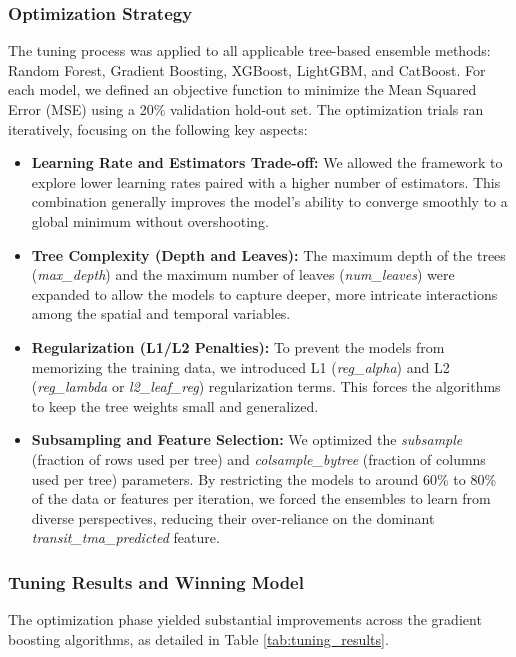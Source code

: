 \subsubsection{Optimization Strategy}
The tuning process was applied to all applicable tree-based ensemble methods: Random Forest, Gradient Boosting, XGBoost, LightGBM, and CatBoost. For each model, we defined an objective function to minimize the Mean Squared Error (MSE) using a 20\% validation hold-out set. The optimization trials ran iteratively, focusing on the following key aspects:

\begin{itemize}
    \item \textbf{Learning Rate and Estimators Trade-off:} We allowed the framework to explore lower learning rates paired with a higher number of estimators. This combination generally improves the model's ability to converge smoothly to a global minimum without overshooting.
    \item \textbf{Tree Complexity (Depth and Leaves):} The maximum depth of the trees (\textit{max\_depth}) and the maximum number of leaves (\textit{num\_leaves}) were expanded to allow the models to capture deeper, more intricate interactions among the spatial and temporal variables.
    \item \textbf{Regularization (L1/L2 Penalties):} To prevent the models from memorizing the training data, we introduced L1 (\textit{reg\_alpha}) and L2 (\textit{reg\_lambda} or \textit{l2\_leaf\_reg}) regularization terms. This forces the algorithms to keep the tree weights small and generalized.
    \item \textbf{Subsampling and Feature Selection:} We optimized the \textit{subsample} (fraction of rows used per tree) and \textit{colsample\_bytree} (fraction of columns used per tree) parameters. By restricting the models to around 60\% to 80\% of the data or features per iteration, we forced the ensembles to learn from diverse perspectives, reducing their over-reliance on the dominant \textit{transit\_tma\_predicted} feature.
\end{itemize}

\subsubsection{Tuning Results and Winning Model}
The optimization phase yielded substantial improvements across the gradient boosting algorithms, as detailed in Table \ref{tab:tuning_results}.

